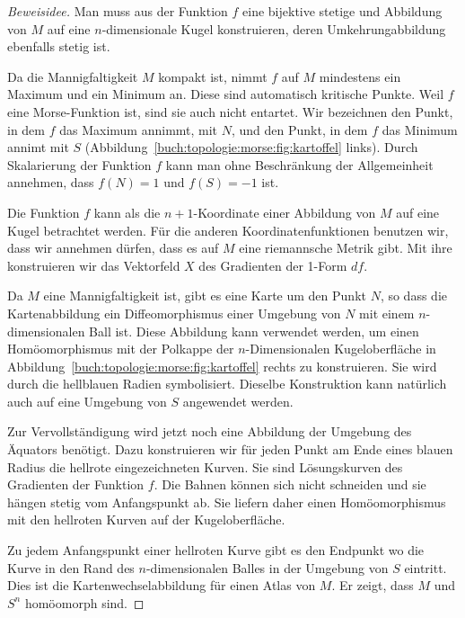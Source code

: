 \begin{proof}[Beweisidee]
%
Man muss aus der Funktion $f$ eine bijektive stetige und Abbildung
von $M$ auf eine $n$-dimensionale Kugel konstruieren, deren
Umkehrungabbildung ebenfalls stetig ist.

Da die Mannigfaltigkeit $M$ kompakt ist, nimmt $f$ auf $M$ mindestens
ein Maximum und ein Minimum an.
Diese sind automatisch kritische Punkte.
Weil $f$ eine Morse-Funktion ist, sind sie auch nicht entartet.
Wir bezeichnen den Punkt, in dem $f$ das Maximum annimmt, mit $N$,
und den Punkt, in dem $f$ das Minimum annimt mit $S$
(Abbildung~\ref{buch:topologie:morse:fig:kartoffel} links).
Durch Skalarierung der Funktion $f$ kann man ohne Beschränkung der
Allgemeinheit annehmen, dass $f(N)=1$ und $f(S) = -1$ ist.

Die Funktion $f$ kann als die $n+1$-Koordinate einer Abbildung von $M$ 
auf eine Kugel betrachtet werden.
Für die anderen Koordinatenfunktionen benutzen wir, dass wir annehmen
dürfen, dass es auf $M$ eine riemannsche Metrik gibt.
Mit ihre konstruieren wir das Vektorfeld $X$ des Gradienten der 1-Form $df$.

Da $M$ eine Mannigfaltigkeit ist, gibt es eine Karte um den Punkt $N$,
so dass die Kartenabbildung ein Diffeomorphismus einer Umgebung von $N$
mit einem $n$-dimensionalen Ball ist.
Diese Abbildung kann verwendet werden, um einen Homöomorphismus 
mit der Polkappe der $n$-Dimensionalen Kugeloberfläche in 
Abbildung~\ref{buch:topologie:morse:fig:kartoffel} rechts zu
konstruieren.
Sie wird durch die hellblauen Radien symbolisiert.
Dieselbe Konstruktion kann natürlich auch auf eine Umgebung von $S$
angewendet werden.

Zur Vervollständigung wird jetzt noch eine Abbildung der Umgebung des
Äquators benötigt.
Dazu konstruieren wir für jeden Punkt am Ende eines blauen Radius die
hellrote eingezeichneten Kurven.
Sie sind Lösungskurven des Gradienten der Funktion $f$.
Die Bahnen können sich nicht schneiden und sie hängen stetig vom
Anfangspunkt ab.
Sie liefern daher einen Homöomorphismus mit den hellroten Kurven
auf der Kugeloberfläche.

Zu jedem Anfangspunkt einer hellroten Kurve gibt es den Endpunkt wo
die Kurve in den Rand des $n$-dimensionalen Balles in der Umgebung
von $S$ eintritt.
Dies ist die Kartenwechselabbildung für einen Atlas von $M$.
Er zeigt, dass $M$ und $S^n$ homöomorph sind.
\end{proof}

